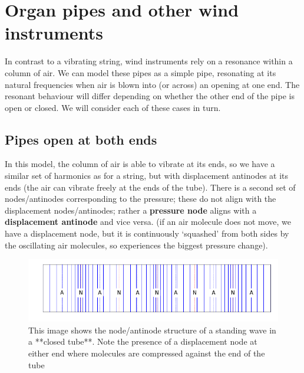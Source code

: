 \documentclass[
]{book}
\begin{document}
\hypertarget{sec:ch10-pipesandwindinstruments}{%
\section{Organ pipes and other wind instruments}\label{sec:ch10-pipesandwindinstruments}}

In contrast to a vibrating string, wind instruments rely on a resonance within a column of air. We can model these pipes as a simple pipe, resonating at its natural frequencies when air is blown into (or across) an opening at one end. The resonant behaviour will differ depending on whether the other end of the pipe is open or closed. We will consider each of these cases in turn.

\hypertarget{pipes-open-at-both-ends}{%
\subsection{Pipes open at both ends}\label{pipes-open-at-both-ends}}

In this model, the column of air is able to vibrate at its ends, so we have a similar set of harmonics as for a string, but with displacement antinodes at its ends (the air can vibrate freely at the ends of the tube). There is a second set of nodes/antinodes corresponding to the pressure; these do not align with the displacement nodes/antinodes; rather a \textbf{pressure node} aligns with a \textbf{displacement antinode} and vice versa. (if an air molecule does not move, we have a displacement node, but it is continuously `squashed' from both sides by the oscillating air molecules, so experiences the biggest pressure change).

\begin{figure}

{\centering \includegraphics[width=0.7\linewidth]{visualisations/ch10-longitudinal-standingwave-n6closed} 

}

\caption{This image shows the node/antinode structure of a standing wave in a **closed tube**. Note the presence of a displacement node at either end where molecules are compressed against the end of the tube }\label{fig:ch10-waves-closedtube}
\end{figure}
\end{document}
